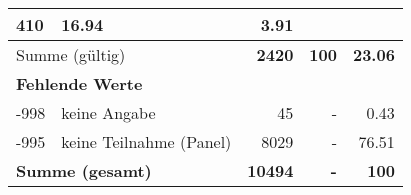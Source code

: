 \begin{longtable}{lXrrr}
       \num{410} &
       \num[round-mode=places,round-precision=2]{16.94} &
         \num[round-mode=places,round-precision=2]{3.91} \\
     \midrule
     \multicolumn{2}{l}{Summe (gültig)} &
       \textbf{\num{2420}} &
     \textbf{\num{100}} &
       \textbf{\num[round-mode=places,round-precision=2]{23.06}} \\
     \multicolumn{5}{l}{\textbf{Fehlende Werte}}\\
       -998 &
       keine Angabe &
         \num{45} &
        - &
         \num[round-mode=places,round-precision=2]{0.43} \\
       -995 &
       keine Teilnahme (Panel) &
         \num{8029} &
        - &
         \num[round-mode=places,round-precision=2]{76.51} \\
     \midrule
     \multicolumn{2}{l}{\textbf{Summe (gesamt)}} &
          \textbf{\num{10494}} &
        \textbf{-} &
        \textbf{\num{100}} \\
     \bottomrule
     \end{longtable}
     
